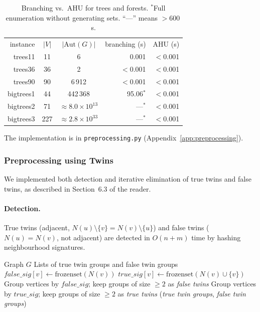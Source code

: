 \documentclass[twoside]{article}
\begin{document}
\begin{table}[H]
\centering
\begin{tabular}{r|c|c|r|r}
instance & $|V|$ & $|\text{Aut}(G)|$ & branching (s) & AHU (s) \\
\noalign{\smallskip}\hline\hline\noalign{\smallskip}
trees11     &  11 &           6 & 0.001 & $<$0.001 \\
trees36     &  36 &           2 & $<$0.001 & $<$0.001 \\
trees90     &  90 &       6\,912 & $<$0.001 & $<$0.001 \\
bigtrees1   &  44 &     442\,368 & 95.06$^*$ & $<$0.001 \\
bigtrees2   &  71 & $\approx 8.0 \times 10^{13}$ & ---$^*$ & $<$0.001 \\
bigtrees3   & 227 & $\approx 2.8 \times 10^{33}$ & ---$^*$ & $<$0.001 \\
\end{tabular}
\caption{Branching vs.\ AHU for trees and forests. $^*$Full enumeration without generating sets. ``---'' means $>600$\,s.}\label{tab:trees}
\end{table}

The implementation is in \texttt{preprocessing.py} (Appendix~\ref{app:preprocessing}).

\subsubsection{Preprocessing using Twins}

We implemented both detection and iterative elimination of true twins and false twins, as described in Section~6.3 of the reader.

\paragraph{Detection.} True twins (adjacent, $N(u)\setminus\{v\} = N(v)\setminus\{u\}$) and false twins ($N(u) = N(v)$, not adjacent) are detected in $O(n + m)$ time by hashing neighbourhood signatures.

\begin{algorithm}[H]
\caption{Find Twin Groups}\label{alg:twins}
\begin{algorithmic}[1]
\Require Graph $G$
\Ensure Lists of true twin groups and false twin groups
    \State $\textit{false\_sig}[v] \gets \text{frozenset}(N(v))$
    \State $\textit{true\_sig}[v] \gets \text{frozenset}(N(v) \cup \{v\})$
\EndFor
\State Group vertices by $\textit{false\_sig}$; keep groups of size $\geq 2$ as \textit{false twins}
\State Group vertices by $\textit{true\_sig}$; keep groups of size $\geq 2$ as \textit{true twins}
\State \Return (\textit{true twin groups}, \textit{false twin groups})
\end{algorithmic}
\end{algorithm}
\end{document}
